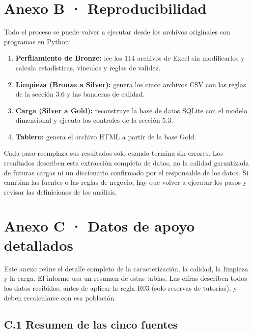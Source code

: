 \documentclass[11pt,letterpaper]{article}
\begin{document}
\section*{Anexo B · Reproducibilidad}

Todo el proceso se puede volver a ejecutar desde los archivos originales con programas en Python:
\begin{enumerate}[leftmargin=1.5em,itemsep=2pt]
\item \textbf{Perfilamiento de Bronze:} lee los 114 archivos de Excel sin modificarlos y calcula estadísticas, vínculos y reglas de validez.
\item \textbf{Limpieza (Bronze a Silver):} genera los cinco archivos CSV con las reglas de la sección 3.6 y las banderas de calidad.
\item \textbf{Carga (Silver a Gold):} reconstruye la base de datos SQLite con el modelo dimensional y ejecuta los controles de la sección 5.3.
\item \textbf{Tablero:} genera el archivo HTML a partir de la base Gold.
\end{enumerate}

Cada paso reemplaza sus resultados solo cuando termina sin errores. Los resultados describen esta extracción completa de datos, no la calidad garantizada de futuras cargas ni un diccionario confirmado por el responsable de los datos. Si cambian las fuentes o las reglas de negocio, hay que volver a ejecutar los pasos y revisar las definiciones de los análisis.

\section*{Anexo C · Datos de apoyo detallados}

Este anexo reúne el detalle completo de la caracterización, la calidad, la limpieza y la carga. El informe usa un resumen de estas tablas. Las cifras describen todos los datos recibidos, antes de aplicar la regla R03 (solo reservas de tutorías), y deben recalcularse con esa población.

\subsection*{C.1 Resumen de las cinco fuentes}
\end{document}
